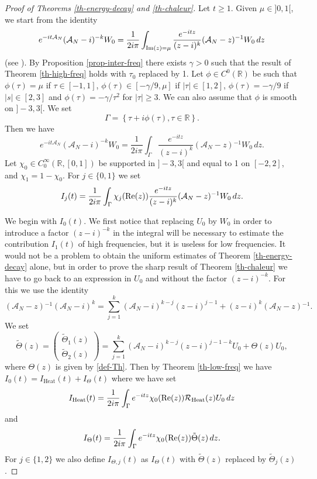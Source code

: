 \documentclass[10pt, a4paper,reqno]{amsart}
\theoremstyle{plain}
\theoremstyle{definition}
\theoremstyle{remark}
\begin{document}
\begin{proof}[Proof of Theorems \ref{th-energy-decay} and \ref{th-chaleur}]
{\noindent {\bf $\bullet$}\quad } 
Let $t {\geqslant} 1$. Given ${\mu} \in ]0,1[$, we start from the identity
\[
e^{-it{{{\mathcal A}}_N}} ({{{\mathcal A}}_N}-i)^{-k} W_0  = \frac 1 {2i\pi} \int_{{\mathop{\rm{Im}}\nolimits}(z) = {\mu}} \frac {e^{-itz}}{(z -i)^k} ({{{\mathcal A}}_N}-z){^{-1}} W_0 \, dz
\]
(see \cite{burq98}).      {
}By Proposition \ref{prop-inter-freq} there exists ${\gamma} > 0$ such that the result of Theorem \ref{th-high-freq} holds with ${\tau}_0$ replaced by 1. 
Let ${\phi} \in C^0({\mathbb{R}})$ be such that ${\phi}({\tau}) = {\mu}$ if ${\tau} \in [-1,1]$, ${\phi}({\tau}) \in [-{\gamma} / 9, {\mu}]$ if ${\left\vert {\tau}\right\vert} \in [1,2]$, ${\phi}({\tau}) = - {\gamma} /9$ if ${\left\vert s\right\vert} \in [2,3]$ and ${\phi}({\tau}) = - {\gamma} / {\tau}^2$ for ${\left\vert {\tau}\right\vert} {\geqslant} 3$. We can also assume that ${\phi}$ is smooth on $]-3,3[$. We set 
\[
{\Gamma} = {\left\{ { {\tau} + i {\phi}({\tau}),{\tau} \in {\mathbb{R}}} \right\}}.
\]
Then we have 
\[
e^{-it{{{\mathcal A}}_N}} ({{{\mathcal A}}_N}-i)^{-k} W_0  = \frac 1 {2i\pi} \int_{\Gamma} \frac {e^{-itz}}{(z -i)^k} ({{{\mathcal A}}_N}-z){^{-1}} W_0 \, dz.
\]
Let ${\chi}_0 \in C_0^\infty({\mathbb{R}},[0,1])$ be supported in $]-3,3[$ and equal to 1 on $[-2,2]$, and ${\chi}_1 = 1 - {\chi}_0$. For $j \in \{0,1\}$ we set 
\[
I_j(t) =  \frac 1 {2i\pi} \int_{\Gamma} {\chi}_j({\mathop{\rm{Re}}\nolimits}(z)) \frac {e^{-itz}}{(z -i)^k} ({{{\mathcal A}}_N}-z){^{-1}} W_0 \, dz.
\]

{\noindent {\bf $\bullet$}\quad } We begin with $I_0(t)$. We first notice that replacing $U_0$ by $W_0$ in order to introduce a factor $(z-i)^{-k}$ in the integral will be necessary to estimate the contribution $I_1(t)$ of high frequencies, but it is useless for low frequencies. It would not be a problem to obtain the uniform estimates of Theorem \ref{th-energy-decay} alone, but in order to prove the sharp result of Theorem \ref{th-chaleur} we have to go back to an expression in $U_0$ and without the factor $(z-i)^{-k}$. For this we use the identity 
\[
({{{\mathcal A}}_N}-z){^{-1}} ({{{\mathcal A}}_N}-i)^k = \sum_{j=1}^{k} ({{{\mathcal A}}_N}-i)^{k-j} (z-i)^{j-1} + (z-i)^k ({{{\mathcal A}}_N}-z){^{-1}}.
\]
We set 
\[
\tilde {\Theta}(z) = \begin{pmatrix} \tilde {\Theta}_1(z) \\ \tilde {\Theta}_2(z) \end{pmatrix} = \sum_{j=1}^{k} ({{{\mathcal A}}_N}-i)^{k-j} (z-i)^{j-1 - k} U_0 + {\Theta}(z) U_0,
\]
where ${\Theta}(z)$ is given by \eqref{def-Th}. Then by Theorem \ref{th-low-freq} we have $I_0(t) = I_{\textrm{Heat}} (t) + I_{\Theta}(t)$ where we have set
\[
I_{\textrm{Heat}}(t) =  \frac 1 {2i\pi} \int_{\Gamma}  e^{-itz} {\chi}_0({\mathop{\rm{Re}}\nolimits}(z)) {{{\mathcal R}}_{\textrm{Heat}}(z)} U_0 \, dz
\]
and
\[
I_{\Theta}(t) = \frac 1 {2i\pi} \int_{\Gamma} e^{-itz} {\chi}_0({\mathop{\rm{Re}}\nolimits}(z)) \tilde {\Theta}(z) \, dz. 
\]
For $j \in \{1,2\}$ we also define $I_{{\Theta},j}(t)$ as $I_{\Theta}(t)$ with $\tilde {\Theta}(z)$ replaced by $\tilde {\Theta}_j(z)$.


\end{proof}
\end{document}
